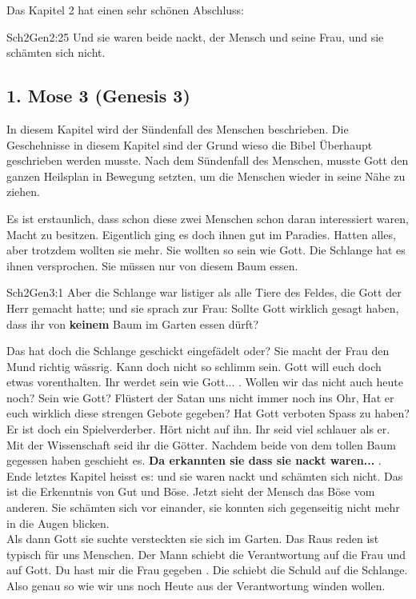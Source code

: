 Das Kapitel 2 hat einen sehr schönen Abschluss:
\begin{bibeltext}{Sch2}{Gen}{2:25}
	Und sie waren beide nackt, der Mensch und seine Frau, und sie schämten sich nicht.
\end{bibeltext}
\subsection{1. Mose 3 (Genesis 3)}
In diesem Kapitel wird der Sündenfall des Menschen beschrieben. Die Geschehnisse in diesem Kapitel sind der Grund wieso die Bibel Überhaupt geschrieben werden musste. Nach dem Sündenfall des Menschen, musste Gott den ganzen Heilsplan in Bewegung setzten, um die Menschen wieder in seine Nähe zu ziehen.

Es ist erstaunlich, dass schon diese zwei Menschen schon daran interessiert waren, Macht zu besitzen. Eigentlich ging es doch ihnen gut im Paradies. Hatten alles, aber trotzdem wollten sie mehr. Sie wollten so sein wie Gott. Die Schlange hat es ihnen versprochen. Sie müssen nur von diesem Baum essen.
\begin{bibeltext}{Sch2}{Gen}{3:1}
	Aber die Schlange war listiger als alle Tiere des Feldes, die Gott der Herr gemacht hatte; und sie sprach zur Frau: Sollte Gott wirklich gesagt haben, dass ihr von \textbf{keinem} Baum im Garten essen dürft?
\end{bibeltext}
Das hat doch die Schlange geschickt eingefädelt oder? Sie macht der Frau den Mund richtig wässrig. Kann doch nicht so schlimm sein. Gott will euch doch etwas vorenthalten. \flqq Ihr werdet sein wie Gott... \frqq{}. Wollen wir das nicht auch heute noch? Sein wie Gott? Flüstert der Satan uns nicht immer noch ins Ohr, \flqq Hat er euch wirklich diese strengen Gebote gegeben? Hat Gott verboten Spass zu haben? Er ist doch ein Spielverderber. Hört nicht auf ihn. Ihr seid viel schlauer als er. Mit der Wissenschaft seid ihr die Götter.\frqq{} 
Nachdem beide von dem tollen Baum gegessen haben geschieht es. \flqq \textbf{Da erkannten sie dass sie nackt waren...} \frqq{}. Ende letztes Kapitel heisst es: \flqq und sie waren nackt und schämten sich nicht\frqq{}. Das ist die Erkenntnis von Gut und Böse. Jetzt sieht der Mensch das Böse vom anderen. Sie schämten sich vor einander, sie konnten sich gegenseitig nicht mehr in die Augen blicken.\\
Als dann Gott sie suchte versteckten sie sich im Garten. Das Raus reden ist typisch für uns Menschen. Der Mann schiebt die Verantwortung auf die Frau und auf Gott. \flqq Du hast mir die Frau gegeben \frqq{}. Die schiebt die Schuld auf die Schlange. Also genau so wie wir uns noch Heute aus der Verantwortung winden wollen.

